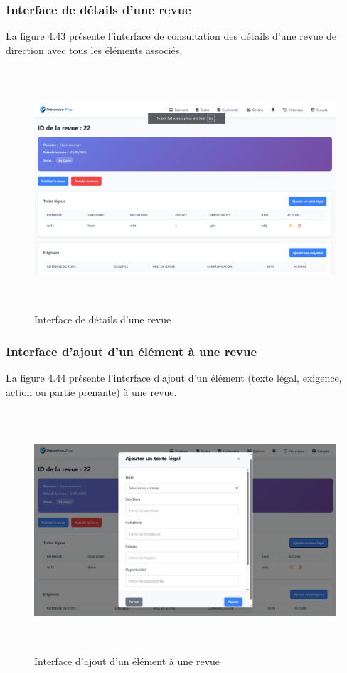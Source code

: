 \subsubsection{Interface de détails d'une revue}
\noindent La figure 4.43 présente l'interface de consultation des détails d'une revue de direction avec tous les éléments associés.

\begin{figure}[H]
    \centering
    \includegraphics[width=14cm,height=9cm]{images/revuedetails.PNG}
    \caption{Interface de détails d'une revue}
\end{figure}

\subsubsection{Interface d'ajout d'un élément à une revue}
\noindent La figure 4.44 présente l'interface d'ajout d'un élément (texte légal, exigence, action ou partie prenante) à une revue.

\begin{figure}[H]
    \centering
    \includegraphics[width=14cm,height=9cm]{images/addelementmodal.PNG}
    \caption{Interface d'ajout d'un élément à une revue}
\end{figure}

